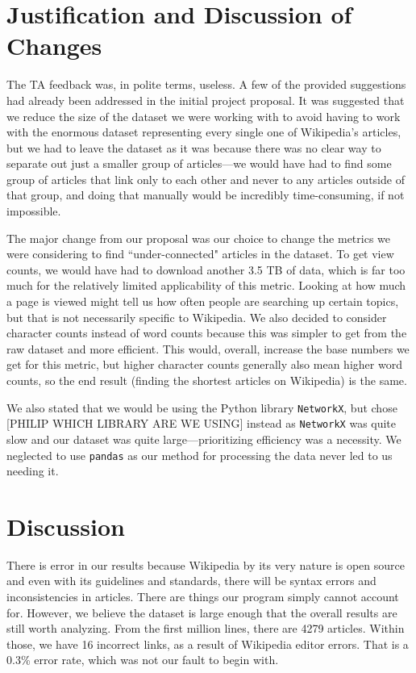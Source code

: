 \documentclass[fontsize=12pt]{article}
\begin{document}
\begin{multicols}{2}
    \section{Justification and Discussion of Changes}
    The TA feedback was, in polite terms, useless. A few of the provided suggestions had already been addressed in the initial project proposal. It was suggested that we reduce the size of the dataset we were working with to avoid having to work with the enormous dataset representing every single one of Wikipedia's articles, but we had to leave the dataset as it was because there was no clear way to separate out just a smaller group of articles---we would have had to find some group of articles that link only to each other and never to any articles outside of that group, and doing that manually would be incredibly time-consuming, if not impossible.
    
    The major change from our proposal was our choice to change the metrics we were considering to find ``under-connected" articles in the dataset. To get view counts, we would have had to download another 3.5 TB of data, which is far too much for the relatively limited applicability of this metric. Looking at how much a page is viewed might tell us how often people are searching up certain topics, but that is not necessarily specific to Wikipedia. We also decided to consider character counts instead of word counts because this was simpler to get from the raw dataset and more efficient. This would, overall, increase the base numbers we get for this metric, but higher character counts generally also mean higher word counts, so the end result (finding the shortest articles on Wikipedia) is the same.
    
    We also stated that we would be using the Python library \texttt{NetworkX}, but chose [PHILIP WHICH LIBRARY ARE WE USING] instead as \texttt{NetworkX} was quite slow and our dataset was quite large---prioritizing efficiency was a necessity. We neglected to use \texttt{pandas} as our method for processing the data never led to us needing it. %
    
    \section{Discussion}
    There is error in our results because Wikipedia by its very nature is open source and even with its guidelines and standards, there will be syntax errors and inconsistencies in articles. There are things our program simply cannot account for. However, we believe the dataset is large enough that the overall results are still worth analyzing. From the first million lines, there are 4279 articles. Within those, we have 16 incorrect links, as a result of Wikipedia editor errors. That is a 0.3\% error rate, which was not our fault to begin with.
    

\end{multicols}
\end{document}
